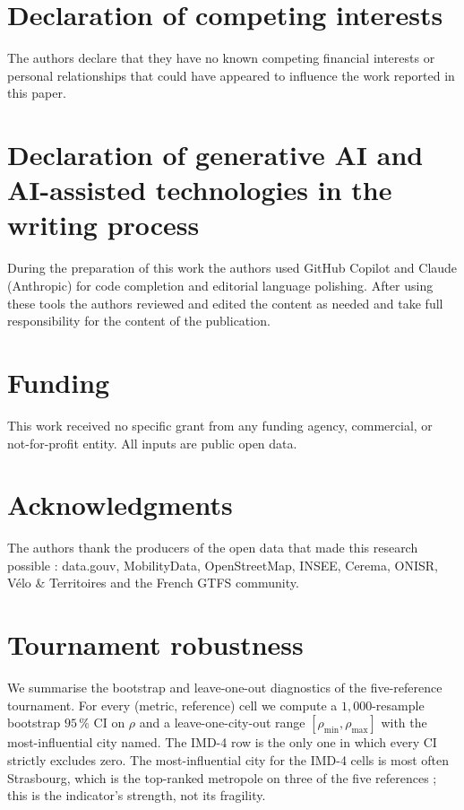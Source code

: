 \documentclass[11pt,a4paper]{article}
\begin{document}
\section*{Declaration of competing interests}
The authors declare that they have no known competing financial
interests or personal relationships that could have appeared to
influence the work reported in this paper.

\section*{Declaration of generative AI and AI-assisted technologies in the writing process}
During the preparation of this work the authors used GitHub
Copilot and Claude (Anthropic) for code completion and
editorial language polishing.  After using these tools the
authors reviewed and edited the content as needed and take full
responsibility for the content of the publication.

\section*{Funding}
This work received no specific grant from any funding agency,
commercial, or not-for-profit entity.  All inputs are public
open data.

\section*{Acknowledgments}
The authors thank the producers of the open data that made this
research possible : data.gouv, MobilityData, OpenStreetMap, INSEE,
Cerema, ONISR, V\'elo \& Territoires and the French GTFS
community.

\appendix

\section{Tournament robustness}
\label{app:robust}

We summarise the bootstrap and leave-one-out diagnostics of the
five-reference tournament.  For every (metric, reference) cell we
compute a $1{,}000$-resample bootstrap $95\,\%$ CI on $\rho$ and a
leave-one-city-out range $[\rho_{\min}, \rho_{\max}]$ with the
most-influential city named.  The IMD-4 row is the only one in
which every CI strictly excludes zero.  The most-influential
city for the IMD-4 cells is most often Strasbourg, which is the
top-ranked metropole on three of the five references ; this is
the indicator's strength, not its fragility.
\end{document}
